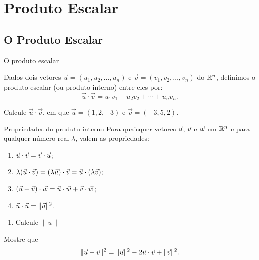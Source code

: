 \section{Produto Escalar}

\subsection*{O Produto Escalar}

\begin{frame}[label=vetores2]{O produto escalar}

\begin{defin}
Dados dois vetores $\vec{u}=(u_1,u_2,\ldots,u_n)$ e $\vec{v}=(v_1,v_2,\ldots,v_n)$ do $\mathbb{R}^n$, definimos o {\color{blue} produto escalar (ou produto interno)} entre eles por:
\[\vec{u}\cdot \vec{v}=u_1v_1+u_2v_2+\cdots+ u_nv_n.\]
\end{defin}

\begin{exe}
Calcule $\vec{u}\cdot \vec{v}$, em que $\vec{u}=(1,2,-3)$ e $\vec{v}=(-3,5,2)$.
\end{exe}

\end{frame}

\begin{frame}[label=vetores2]

\begin{block}{Propriedades do produto interno} Para quaisquer vetores $\vec{u}$, $\vec{v}$ e $\vec{w}$ em $\mathbb{R}^n$ e para qualquer número real $\lambda$, valem as propriedades:
			
			\begin{enumerate}
				\item ${\vec{u}}\cdot {\vec{v}}={\vec{v}}\cdot{\vec{u}}$;
				\item $\lambda( {\vec{u}}\cdot {\vec{v}})=(\lambda  {\vec{u}})\cdot {\vec{v}}=  {\vec{u}}\cdot(\lambda {\vec{v}});$
				\item $( {\vec{u}}+ \vec{v})\cdot {\vec{w}}= {\vec{u}}\cdot {\vec{w}}+ {\vec{v}}\cdot {\vec{w}}$;
				\item $ {\vec{u}}\cdot {\vec{u}}=\| {\vec{u}}\|^2$.
			\end{enumerate}            
		\end{block}
\begin{exe}
\begin{enumerate}
\item Calcule $\|u\|$
\end{enumerate}


Mostre que
\[\|\vec{u}-\vec{v}\|^2=\|\vec{u}\|^2-2\vec{u}\cdot \vec{v}+\|\vec{v}\|^2.\]
\end{exe}

\end{frame}

